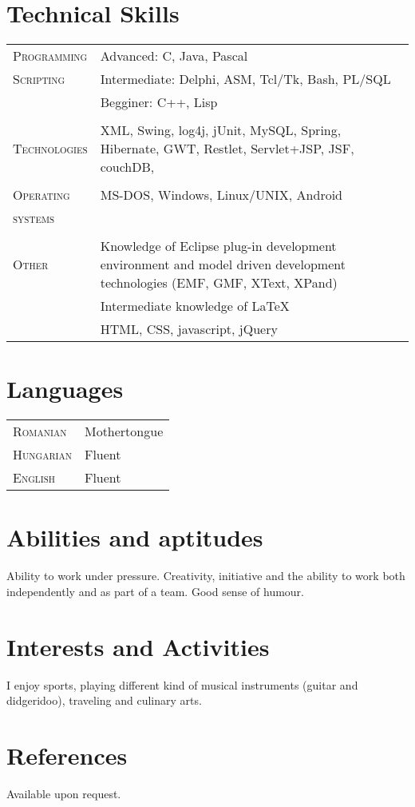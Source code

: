 \documentclass[a4paper,10pt]{article}
\begin{document}
\section{Technical Skills}
\begin{tabular}{p{2.5cm}p{11cm}}
\textsc{Programming} & Advanced: C, Java, Pascal \\
\textsc{Scripting} & Intermediate: Delphi, ASM, Tcl/Tk, Bash, PL/SQL \\
& Begginer: C++, Lisp \\
 \multicolumn{2}{c}{} \\ 
 \textsc{Technologies} & XML, Swing, log4j, jUnit, MySQL, Spring, Hibernate,
 GWT, Restlet, Servlet+JSP, JSF,  couchDB, \\ 
 \multicolumn{2}{c}{} \\
 \textsc{Operating} & MS-DOS, Windows, Linux/UNIX, Android\\
 \textsc{systems}&\\ 
 \multicolumn{2}{c}{} \\
 \textsc{Other} & Knowledge of Eclipse plug-in development environment and model
 driven development technologies (EMF, GMF, XText, XPand)\\
 & Intermediate knowledge of \LaTeX \\
 & HTML, CSS, javascript, jQuery\\
\end{tabular}

\section{Languages}
\begin{tabular}{p{2.5cm}p{11cm}}
\textsc{Romanian}&Mothertongue\\
\textsc{Hungarian}& Fluent\\
\textsc{English}& Fluent\\
\end{tabular}

\section{Abilities and aptitudes}
Ability to work under pressure.
Creativity, initiative and the ability to work both independently and as part of
a team. Good sense of humour.

\section{Interests and Activities}
I enjoy sports, playing different kind of musical instruments (guitar and
didgeridoo), traveling and culinary arts.

\section{References}
Available upon request.


\end{document}
